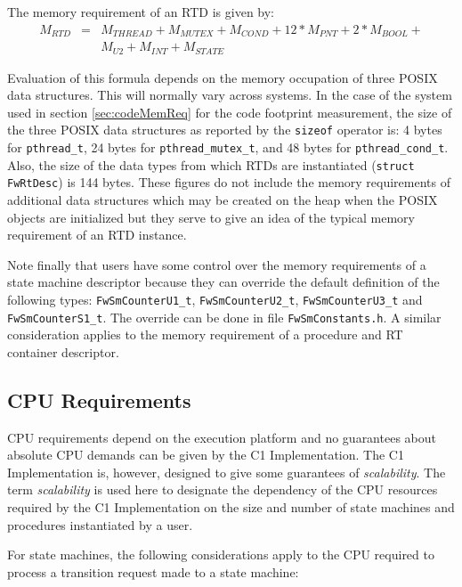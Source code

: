 \documentclass[manual]{../fwprofile}
\begin{document}
The memory requirement of an RTD is given by:
\begin{eqnarray*}
M_{RTD} & = & M_{THREAD} + M_{MUTEX} + M_{COND} + 12 * M_{PNT} + 2 * M_{BOOL} + \\
        &   & M_{U2} + M_{INT} + M_{STATE}
\end{eqnarray*}

Evaluation of this formula depends on the memory occupation of three POSIX data structures. This will normally vary across systems. In the case of the system used in section \ref{sec:codeMemReq} for the code footprint measurement, the size of the three POSIX data structures as reported by the \texttt{sizeof} operator is: 4 bytes for \texttt{pthread\_t}, 24 bytes for \texttt{pthread\_mutex\_t}, and 48 bytes for \texttt{pthread\_cond\_t}. Also, the size of the data types from which RTDs are instantiated (\texttt{struct FwRtDesc}) is 144 bytes. These figures do not include the memory requirements of additional data structures which may be created on the heap when the POSIX objects are initialized  but they serve to give an idea of the typical memory requirement of an RTD instance.

Note finally that users have some control over the memory requirements of a state machine 
descriptor because they can override the 
default definition of the following types: \texttt{FwSmCounterU1\_t}, \texttt{FwSmCounterU2\_t}, \texttt{FwSmCounterU3\_t} and 
\texttt{FwSmCounterS1\_t}. The override can be done in file \texttt{FwSmConstants.h}.
A similar consideration applies to the memory requirement of a procedure and RT container descriptor.

\subsection{CPU Requirements}
CPU requirements depend on the execution platform and no guarantees about absolute CPU demands can be given 
by the C1 Implementation. 
The C1 Implementation is, however, designed to give some guarantees of \emph{scalability}. 
The term \emph{scalability} is used here to designate 
the dependency of the CPU resources required by the C1 Implementation on the size and number of state machines 
and procedures instantiated by a user. 

For state machines, the following considerations apply to the CPU required to process a transition 
request made to a state machine:
\end{document}
